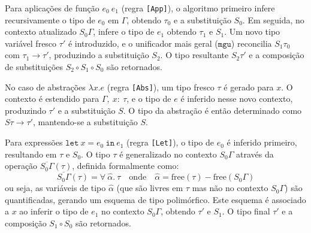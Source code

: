 Para aplicações de função $e_0\ e_1$ (regra \texttt{[App]}), o algoritmo primeiro infere recursivamente o tipo de $e_0$ em $\Gamma$, obtendo $\tau_0$ e a substituição $S_0$.
Em seguida, no contexto atualizado $S_0\Gamma$, infere o tipo de $e_1$ obtendo $\tau_1$ e $S_1$.
Um novo tipo variável fresco $\tau'$ é introduzido, e o unificador mais geral ($\mathtt{mgu}$) reconcilia $S_1\tau_0$ com $\tau_1 \rightarrow \tau'$, produzindo a substituição $S_2$.
O tipo resultante $S_2\tau'$ e a composição de substituições $S_2 \circ S_1 \circ S_0$ são retornados.

No caso de abstrações $\lambda x.e$ (regra \texttt{[Abs]}), um tipo fresco $\tau$ é gerado para $x$.
O contexto é estendido para $\Gamma,\ x{:}\ \tau$, e o tipo de $e$ é inferido nesse novo contexto, produzindo $\tau'$ e a substituição $S$.
O tipo da abstração é então determinado como $S\tau \rightarrow \tau'$, mantendo-se a substituição $S$.

Para expressões $\mathtt{let}\ x = e_0\ \mathtt{in}\ e_1$ (regra \texttt{[Let]}), o tipo de $e_0$ é inferido primeiro, resultando em $\tau$ e $S_0$.
O tipo $\tau$ é generalizado no contexto $S_0\Gamma$ através da operação $\overline{S_0\Gamma}(\tau)$, definida formalmente como:
\[
\overline{S_0\Gamma}(\tau) = \forall\ \hat{\alpha}.\ \tau \quad \text{onde} \quad \hat{\alpha} = \text{free}(\tau) - \text{free}(S_0\Gamma)
\]
ou seja, as variáveis de tipo $\hat{\alpha}$ (que são livres em $\tau$ mas não no contexto $S_0\Gamma$) são quantificadas, gerando um esquema de tipo polimórfico.
Este esquema é associado a $x$ ao inferir o tipo de $e_1$ no contexto $S_0\Gamma$, obtendo $\tau'$ e $S_1$.
O tipo final $\tau'$ e a composição $S_1 \circ S_0$ são retornados.
